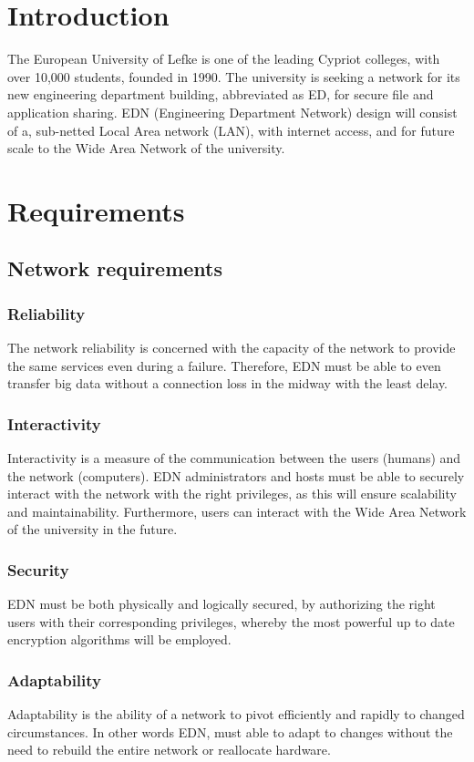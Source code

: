 \documentclass[ a4, 12pt, onecolumn]{IEEEtran}
\begin{document}
\section{Introduction}
The European University of Lefke is one of the leading Cypriot colleges, with over 10,000 students, founded in 1990. The university is seeking a network for its new engineering department building, abbreviated as ED, for secure file and application sharing.
EDN (Engineering Department Network) design will consist of a, sub-netted Local Area network (LAN), with internet access, and for future scale to the Wide Area Network of the university.

\section{Requirements}
\label{sec:requ}
\subsection{Network requirements}
\subsubsection{Reliability}
The network reliability is concerned with the capacity of the network to provide the same services even during a failure. Therefore, EDN must be able to even transfer big data without a connection loss in the midway with the least delay.

\subsubsection{Interactivity}
Interactivity is a measure of the communication between the users (humans) and the network (computers). EDN administrators and hosts must be able to securely interact with the network with the right privileges, as this will ensure scalability and maintainability. Furthermore, users can interact with the Wide Area Network of the university in the future.

\subsubsection{Security}
EDN must be both physically and logically secured, by authorizing the right users with their corresponding privileges, whereby the most powerful up to date encryption algorithms will be employed.

\subsubsection{Adaptability}
Adaptability is the ability of a network to pivot efficiently and rapidly to changed circumstances. In other words EDN, must able to adapt to changes without the need to rebuild the entire network or reallocate hardware.
\end{document}
